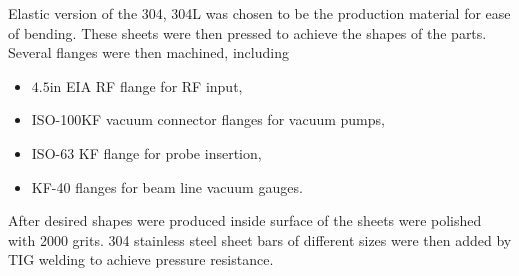 \documentclass[a4paper,oneside,12pt]{report}
\numberwithin{equation}{chapter}
\begin{document}
Elastic version of the 304, 304L was chosen to be the production material for ease of bending.
These sheets were then pressed to achieve the shapes of the parts. 
Several flanges were then machined, including
\begin{itemize}
    \item $4.5$in EIA RF flange for RF input,
    \item ISO-100KF vacuum connector flanges for vacuum pumps,
    \item ISO-63 KF flange for probe insertion,
    \item KF-40 flanges for beam line vacuum gauges.
\end{itemize}
After desired shapes were produced inside surface of the sheets were polished with 2000 grits. 
304 stainless steel sheet bars of different sizes were then added by 
TIG welding to achieve pressure resistance.
\end{document}

